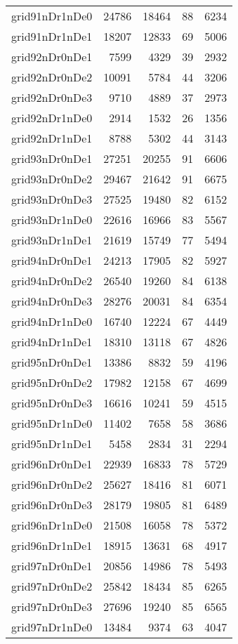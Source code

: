 \begin{tabular}{lrrrr}
grid91nDr1nDe0 & 24786 & 18464 & 88 & 6234 \\
grid91nDr1nDe1 & 18207 & 12833 & 69 & 5006 \\
grid92nDr0nDe1 & 7599 & 4329 & 39 & 2932 \\
grid92nDr0nDe2 & 10091 & 5784 & 44 & 3206 \\
grid92nDr0nDe3 & 9710 & 4889 & 37 & 2973 \\
grid92nDr1nDe0 & 2914 & 1532 & 26 & 1356 \\
grid92nDr1nDe1 & 8788 & 5302 & 44 & 3143 \\
grid93nDr0nDe1 & 27251 & 20255 & 91 & 6606 \\
grid93nDr0nDe2 & 29467 & 21642 & 91 & 6675 \\
grid93nDr0nDe3 & 27525 & 19480 & 82 & 6152 \\
grid93nDr1nDe0 & 22616 & 16966 & 83 & 5567 \\
grid93nDr1nDe1 & 21619 & 15749 & 77 & 5494 \\
grid94nDr0nDe1 & 24213 & 17905 & 82 & 5927 \\
grid94nDr0nDe2 & 26540 & 19260 & 84 & 6138 \\
grid94nDr0nDe3 & 28276 & 20031 & 84 & 6354 \\
grid94nDr1nDe0 & 16740 & 12224 & 67 & 4449 \\
grid94nDr1nDe1 & 18310 & 13118 & 67 & 4826 \\
grid95nDr0nDe1 & 13386 & 8832 & 59 & 4196 \\
grid95nDr0nDe2 & 17982 & 12158 & 67 & 4699 \\
grid95nDr0nDe3 & 16616 & 10241 & 59 & 4515 \\
grid95nDr1nDe0 & 11402 & 7658 & 58 & 3686 \\
grid95nDr1nDe1 & 5458 & 2834 & 31 & 2294 \\
grid96nDr0nDe1 & 22939 & 16833 & 78 & 5729 \\
grid96nDr0nDe2 & 25627 & 18416 & 81 & 6071 \\
grid96nDr0nDe3 & 28179 & 19805 & 81 & 6489 \\
grid96nDr1nDe0 & 21508 & 16058 & 78 & 5372 \\
grid96nDr1nDe1 & 18915 & 13631 & 68 & 4917 \\
grid97nDr0nDe1 & 20856 & 14986 & 78 & 5493 \\
grid97nDr0nDe2 & 25842 & 18434 & 85 & 6265 \\
grid97nDr0nDe3 & 27696 & 19240 & 85 & 6565 \\
grid97nDr1nDe0 & 13484 & 9374 & 63 & 4047 \\

\end{tabular}
